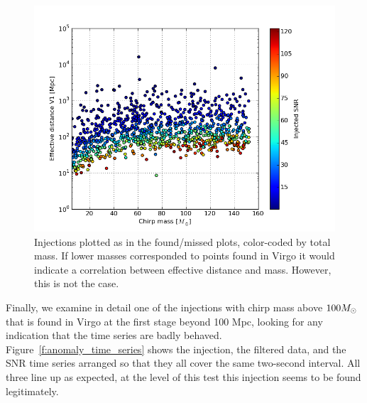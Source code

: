 \begin{figure}
  \includegraphics[width=\linewidth]{figures/ninja2_results/anomaly_snrs}
  \caption[Injections color-coded by total mass]{
  \label{f:anomaly_masses}
Injections plotted as in the found/missed plots, color-coded by total
mass.  If lower masses corresponded to points found in Virgo it would 
indicate a correlation between effective distance and mass.  However, this
is not the case.
}
\end{figure}%

Finally, we examine in detail one of the injections with chirp mass
above $100 M_\odot$ that is found in Virgo at the first stage beyond 100
Mpc, looking for any indication that the time series are badly
behaved.  Figure~\ref{f:anomaly_time_series} shows the injection, the
filtered data, and the SNR time series arranged so that they all cover
the same two-second interval.  All three line up as expected, at the
level of this test this injection seems to be found legitimately.

